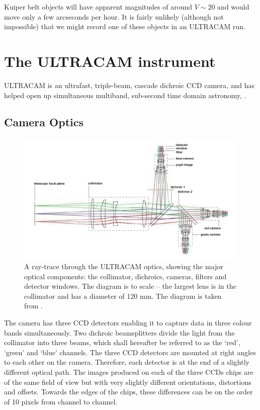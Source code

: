 Kuiper belt objects will have apparent magnitudes of around $V\sim 20$ and would move only a few arcseconds per hour. It is fairly unlikely (although not impossible) that we might record one of these objects in an ULTRACAM run. 

\section{The ULTRACAM instrument} 
ULTRACAM is an ultrafast, triple-beam, cascade dichroic CCD camera, and has helped open up simultaneous multiband, sub-second time domain astronomy, \citep{dhillon07}. 

\subsection{Camera Optics}

\begin{figure}
\centering
\includegraphics[width=120mm]{images/ucamoptics.png}
\caption{A ray-trace through the ULTRACAM optics, showing the major optical components: the collimator, dichroics, cameras, filters and detector windows. The diagram is to scale – the largest lens is in the collimator and has a diameter of 120 mm. The diagram is taken from \citet{dhillon07}.}
\label{fig:optics}
\end{figure}

The camera has three CCD detectors enabling it to capture data in three colour bands simultaneously. Two dichroic beamsplitters divide the light from the collimator into three beams, which shall hereafter be referred to as the `red', `green' and `blue' channels. The three CCD detectors are mounted at right angles to each other on the camera. Therefore, each detector is at the end of a slightly different optical path. The images produced on each of the three CCDs chips are of the same field of view but with very slightly different orientations, distortions and offsets. Towards the edges of the chips, these differences can be on the order of 10 pixels from channel to channel. 

